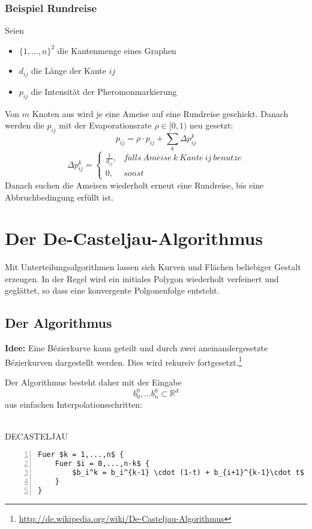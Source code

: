 \subsubsection{Beispiel Rundreise}
Seien
\begin{itemize}
	\item \(\{1,...,n\}^2\) die Kantenmenge eines Graphen
	\item \(d_{ij}\) die Länge der Kante \(ij\)
	\item \(p_{ij}\) die Intensität der Pheromonmarkierung
\end{itemize}
Von \(m\) Knoten aus wird je eine Ameise auf eine Rundreise geschickt. Danach werden die \(p_{ij}\) mit der Evaporationsrate \(\rho \in \lbrack 0,1)\) neu gesetzt:
\[p_{ij} = \rho \cdot p_{ij} + \sum_k \Delta p_{ij}^k\]
\[\Delta p_{ij}^k = \begin{cases} \frac{1}{d_{ij}}, & falls~Ameise~k~Kante~ij~benutze \\ 0, & sonst \end{cases}\]
Danach suchen die Ameisen wiederholt erneut eine Rundreise, bis eine Abbruchbedingung erfüllt ist.



\section{Der De-Casteljau-Algorithmus}
Mit Unterteilungsalgorithmen lassen sich Kurven und Flächen beliebiger Gestalt erzeugen. In der Regel wird ein initiales Polygon wiederholt verfeinert und geglättet, so dass eine konvergente Polgonenfolge entsteht.

\subsection{Der Algorithmus}
\textbf{Idee:} Eine Bézierkurve kann geteilt und durch zwei aneinandergesetzte Bézierkurven dargestellt werden. Dies wird rekursiv fortgesetzt.\footnote{\url{http://de.wikipedia.org/wiki/De-Casteljau-Algorithmus}}

Der Algorithmus besteht daher mit der Eingabe
\[b_0^0,...b_n^0 \subset \mathbb{R}^d\]
aus einfachen Interpolationsschritten:
\\\\
\begin{minipage}{\textwidth}
DECASTELJAU
\begin{lstlisting}[frame=single,numbers=left,mathescape]
Fuer $k = 1,...,n$ {
	Fuer $i = 0,...,n-k$ {
		$b_i^k = b_i^{k-1} \cdot (1-t) + b_{i+1}^{k-1}\cdot t$ 
	}
}
\end{lstlisting}
\end{minipage}


